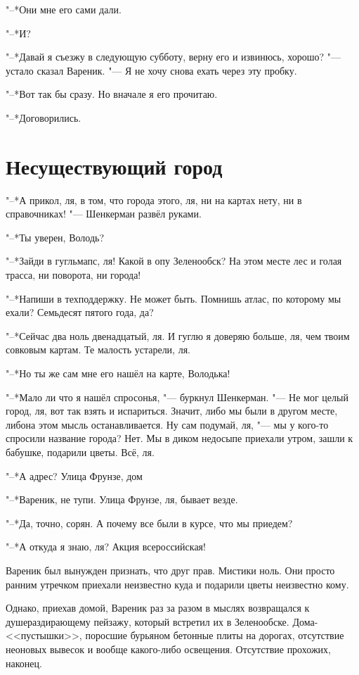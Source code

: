 "--*Они мне его сами дали.

"--*И?

"--*Давай я съезжу в следующую субботу, верну его и извинюсь, хорошо? "--- устало сказал Вареник.
"--- Я не хочу снова ехать через эту пробку.

"--*Вот так бы сразу.
Но вначале я его прочитаю.

"--*Договорились.

\section{Несуществующий город}

"--*А прикол, ля, в том, что города этого, ля, ни на картах нету, ни в справочниках! "--- Шенкерман развёл руками.

"--*Ты уверен, Володь?

"--*Зайди в гугльмапс, ля!
Какой в опу Зеленообск?
На этом месте лес и голая трасса, ни поворота, ни города!

"--*Напиши в техподдержку.
Не может быть.
Помнишь атлас, по которому мы ехали?
Семьдесят пятого года, да?

"--*Сейчас два ноль двенадцатый, ля.
И гуглю я доверяю больше, ля, чем твоим совковым картам.
Те малость устарели, ля.

"--*Но ты же сам мне его нашёл на карте, Володька!

"--*Мало ли что я нашёл спросонья, "--- буркнул Шенкерман.
"--- Не мог целый город, ля, вот так взять и испариться. 
Значит, либо мы были в другом месте, либо\ldotst на этом мысль останавливается. 
Ну сам подумай, ля, "--- мы у кого-то спросили название города?
Нет.
Мы в диком недосыпе приехали утром, зашли к бабушке, подарили цветы.
Всё, ля.

"--*А адрес?
Улица Фрунзе, дом\ldotst

"--*Вареник, не тупи.
Улица Фрунзе, ля, бывает везде.

"--*Да, точно, сорян.
А почему все были в курсе, что мы приедем?

"--*А откуда я знаю, ля?
Акция всероссийская!

Вареник был вынужден признать, что друг прав.
Мистики ноль. 
Они просто ранним утречком приехали неизвестно куда и подарили цветы неизвестно кому.

Однако, приехав домой, Вареник раз за разом в мыслях возвращался к душераздирающему пейзажу, который встретил их в Зеленообске.
Дома-<<пустышки>>, поросшие бурьяном бетонные плиты на дорогах, отсутствие неоновых вывесок и вообще какого-либо освещения.
Отсутствие прохожих, наконец.

